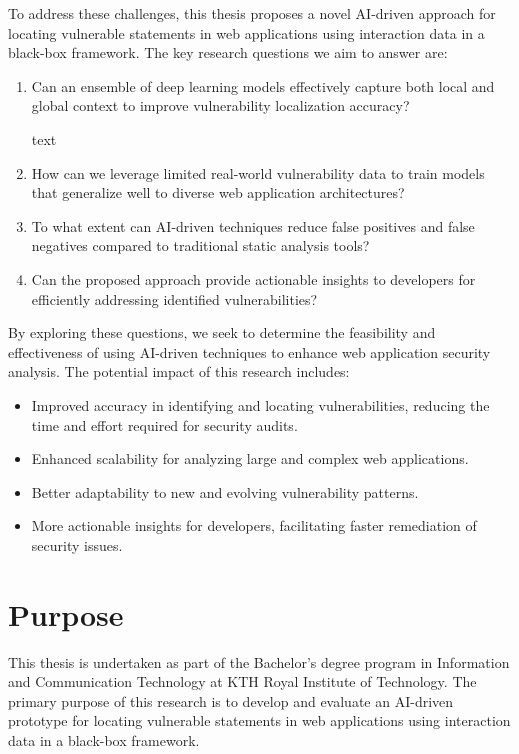 To address these challenges, this thesis proposes a novel AI-driven approach for locating vulnerable statements in web applications using interaction data in a black-box framework. The key research questions we aim to answer are:

\begin{enumerate}
\item Can an ensemble of deep learning models effectively capture both local and global context to improve vulnerability localization accuracy?

text
\item How can we leverage limited real-world vulnerability data to train models that generalize well to diverse web application architectures?

\item To what extent can AI-driven techniques reduce false positives and false negatives compared to traditional static analysis tools?

\item Can the proposed approach provide actionable insights to developers for efficiently addressing identified vulnerabilities?
\end{enumerate}

By exploring these questions, we seek to determine the feasibility and effectiveness of using AI-driven techniques to enhance web application security analysis. The potential impact of this research includes:

\begin{itemize}
\item Improved accuracy in identifying and locating vulnerabilities, reducing the time and effort required for security audits.
\item Enhanced scalability for analyzing large and complex web applications.
\item Better adaptability to new and evolving vulnerability patterns.
\item More actionable insights for developers, facilitating faster remediation of security issues.
\end{itemize}
\section{Purpose}
This thesis is undertaken as part of the Bachelor's degree program in Information and Communication Technology at KTH Royal Institute of Technology. The primary purpose of this research is to develop and evaluate an AI-driven prototype for locating vulnerable statements in web applications using interaction data in a black-box framework.

